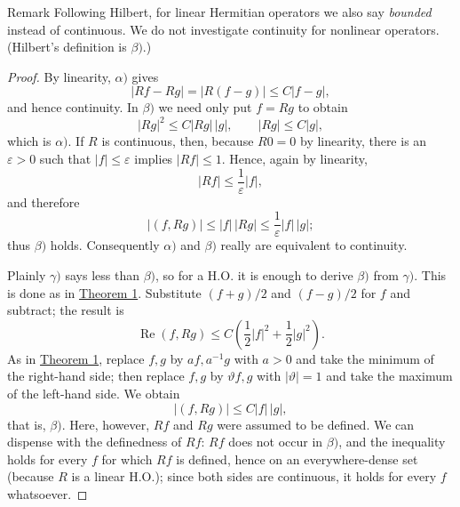﻿\documentclass[paper=b5,fontsize=13pt,bookmarkpackage=false,twoside]{scrartcl}
\begin{document}

\begin{namedstatement}{Remark}{}\label{rem:12}
Following Hilbert, for linear Hermitian operators we also say \emph{bounded} instead of continuous. We do not investigate continuity for nonlinear operators. (Hilbert's definition is $\beta)$.)
\end{namedstatement}

\begin{proof}
By linearity, $\alpha)$ gives
\[
|Rf-Rg|=|R(f-g)|\le C|f-g|,
\]
and hence continuity. In $\beta)$ we need only put $f=Rg$ to obtain
\[
|Rg|^2\le C|Rg|\,|g|,\qquad |Rg|\le C|g|,
\]
which is $\alpha)$. If $R$ is continuous, then, because $R0=0$ by linearity, there is an $\varepsilon>0$ such that $|f|\le\varepsilon$ implies $|Rf|\le1$. Hence, again by linearity,
\[
|Rf|\le\frac1\varepsilon |f|,
\]
and therefore
\[
|(f,Rg)|\le |f|\,|Rg|\le\frac1\varepsilon |f|\,|g|;
\]
thus $\beta)$ holds. Consequently $\alpha)$ and $\beta)$ really are equivalent to continuity.

Plainly $\gamma)$ says less than $\beta)$, so for a H.O. it is enough to derive $\beta)$ from $\gamma)$. This is done as in \hyperref[thm:1]{Theorem 1}. Substitute $(f+g)/2$ and $(f-g)/2$ for $f$ and subtract; the result is
\[
\operatorname{Re}(f,Rg)\le
C\left(\frac12|f|^2+\frac12|g|^2\right).
\]
As in \hyperref[thm:1]{Theorem 1}, replace $f,g$ by $af,a^{-1}g$ with $a>0$ and take the minimum of the right-hand side; then replace $f,g$ by $\vartheta f,g$ with $|\vartheta|=1$ and take the maximum of the left-hand side. We obtain
\[
|(f,Rg)|\le C|f|\,|g|,
\]
that is, $\beta)$. Here, however, $Rf$ and $Rg$ were assumed to be defined. We can dispense with the definedness of $Rf$: $Rf$ does not occur in $\beta)$, and the inequality holds for every $f$ for which $Rf$ is defined, hence on an everywhere-dense set (because $R$ is a linear H.O.); since both sides are continuous, it holds for every $f$ whatsoever.
\end{proof}
\end{document}
